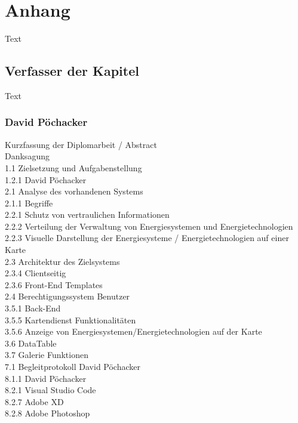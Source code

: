 \chapter{Anhang}
Text

\section{Verfasser der Kapitel}
Text
\subsection{David Pöchacker}
Kurzfassung der Diplomarbeit / Abstract \\
Danksagung \\
1.1 Zielsetzung und Aufgabenstellung  \\
1.2.1 David Pöchacker \\
2.1 Analyse des vorhandenen Systems 	 \\
2.1.1 Begriffe \\
2.2.1 Schutz von vertraulichen Informationen  \\
2.2.2 Verteilung der Verwaltung von Energiesystemen und Energietechnologien 	 \\
2.2.3 Visuelle Darstellung der Energiesysteme / Energietechnologien auf einer Karte \\
2.3 Architektur des Zielsystems  \\
2.3.4 Clientseitig  \\
2.3.6  Front-End Templates  \\
2.4 Berechtigungssystem Benutzer  \\
3.5.1 Back-End  \\
3.5.5  Kartendienst Funktionalitäten  \\
3.5.6  Anzeige von Energiesystemen/Energietechnologien auf der Karte  \\
3.6 DataTable  \\
3.7 Galerie Funktionen  \\
7.1 Begleitprotokoll David Pöchacker	 \\
8.1.1 David Pöchacker \\
8.2.1 Visual Studio Code  \\
8.2.7 Adobe XD  \\
8.2.8 Adobe Photoshop  \\


